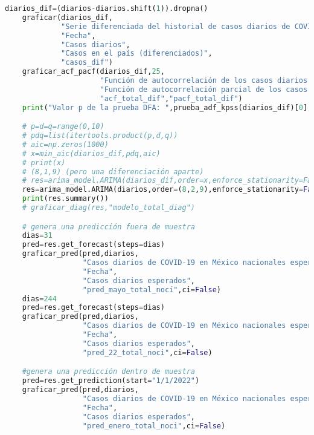 \documentclass[11pt,letterpaper]{article}
\theoremstyle{definition}
\theoremstyle{theorem}
\theoremstyle{remark}
\begin{document}
\begin{appendices}
\begin{lstlisting}[language=Python]
    diarios_dif=(diarios-diarios.shift(1)).dropna()
    graficar(diarios_dif,
             "Serie diferenciada del historial de casos diarios de COVID-19 en México nacionales",
             "Fecha",
             "Casos diarios",
             "Casos en el país (diferenciados)",
             "casos_dif")
    graficar_acf_pacf(diarios_dif,25,
                      "Función de autocorrelación de los casos diarios de COVID-19 diferenciados",
                      "Función de autocorrelación parcial de los casos diarios de COVID-19 diferenciados",
                      "acf_total_dif","pacf_total_dif")
    print("Valor p de la prueba DFA: ",prueba_adf_kpss(diarios_dif)[0],"\nValor p de la prueba KPSS: ",prueba_adf_kpss(diarios_dif)[1])

    # p=d=q=range(0,10)
    # pdq=list(itertools.product(p,d,q))
    # aic=np.zeros(1000)
    # x=min_aic(diarios_dif,pdq,aic)
    # print(x)
    # (8,1,9) (pero una diferenciación aparte)
    # res=arima_model.ARIMA(diarios_dif,order=x,enforce_stationarity=False,enforce_invertibility=False).fit()
    res=arima_model.ARIMA(diarios,order=(8,2,9),enforce_stationarity=False,enforce_invertibility=False).fit()
    print(res.summary())
    # graficar_diag(res,"modelo_total_diag")

    # genera una predicción fuera de muestra
    dias=31
    pred=res.get_forecast(steps=dias)
    graficar_pred(pred,diarios,
                  "Casos diarios de COVID-19 en México nacionales esperados a partir de Mayo del 2022\ncon todos los datos (sin IP)",
                  "Fecha",
                  "Casos diarios esperados",
                  "pred_mayo_total_noci",ci=False)
    dias=244
    pred=res.get_forecast(steps=dias)
    graficar_pred(pred,diarios,
                  "Casos diarios de COVID-19 en México nacionales esperados para el 2022\ncon todos los datos (sin IP)",
                  "Fecha",
                  "Casos diarios esperados",
                  "pred_22_total_noci",ci=False)

    #genera una predicción dentro de muestra
    pred=res.get_prediction(start="1/1/2022")
    graficar_pred(pred,diarios,
                  "Casos diarios de COVID-19 en México nacionales esperados a partir de Enero del 2022\ncon todos los datos (sin IP)",
                  "Fecha",
                  "Casos diarios esperados",
                  "pred_enero_total_noci",ci=False)\end{lstlisting}
	\end{appendices}
	\clearpage
	\printbibliography[title={Referencias bibliográficas}]
\end{document}
